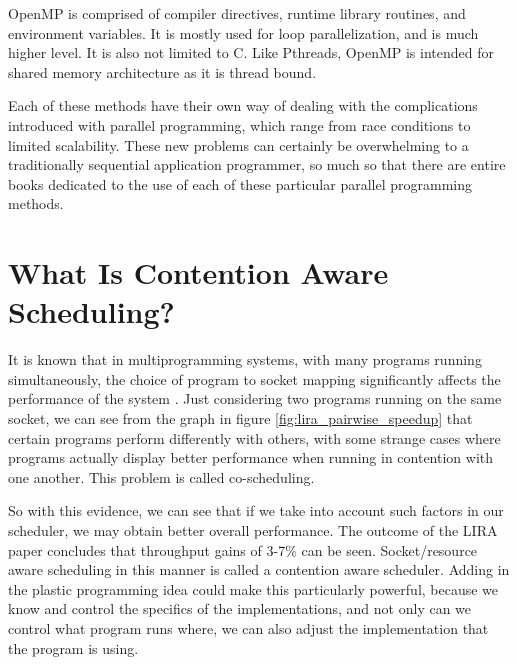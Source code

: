 OpenMP is comprised of compiler directives, runtime library routines, and environment variables. It is mostly used for loop parallelization, and is much higher level. It is also not limited to C. Like Pthreads, OpenMP is intended for shared memory architecture as it is thread bound.

Each of these methods have their own way of dealing with the complications introduced with parallel programming, which range from race conditions to limited scalability. These new problems can certainly be overwhelming to a traditionally sequential application programmer, so much so that there are entire books dedicated to the use of each of these particular parallel programming methods. 



\section{What Is Contention Aware Scheduling?}

It is known that in multiprogramming systems, with many programs running simultaneously, the choice of program to socket mapping significantly affects the performance of the system \cite{lira}. Just considering two programs running on the same socket, we can see from the graph in figure \ref{fig:lira_pairwise_speedup} that certain programs perform differently with others, with some strange cases where programs actually display better performance when running in contention with one another. This problem is called co-scheduling.

So with this evidence, we can see that if we take into account such factors in our scheduler, we may obtain better overall performance. The outcome of the LIRA paper concludes that throughput gains of 3-7\% can be seen. Socket/resource aware scheduling in this manner is called a contention aware scheduler. Adding in the plastic programming idea could make this particularly powerful, because we know and control the specifics of the implementations, and not only can we control what program runs where, we can also adjust the implementation that the program is using.

